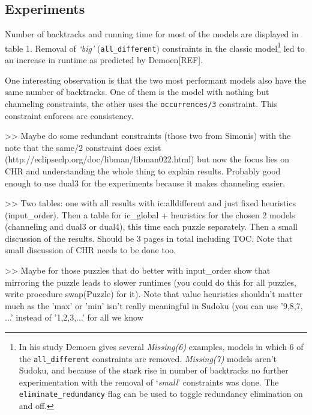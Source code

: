 \subsection{Experiments}

Number of backtracks and running time for most of the models are displayed in table 1. Removal of \textit{`big'} (\texttt{all\_different}) constraints in the classic model\footnote{In his study Demoen gives several \textit{Missing(6)} examples, models in which 6 of the \texttt{all\_different} constraints are removed. \textit{Missing(7)} models aren't Sudoku, and because of the stark rise in number of backtracks no further experimentation with the removal of `\textit{small}' constraints was done. The \texttt{eliminate\_redundancy} flag can be used to toggle redundancy elimination on and off.} led to an increase in runtime as predicted by Demoen[REF]. \\\par

One interesting observation is that the two most performant models also have the same number of backtracks. One of them is the model with nothing but channeling constraints, the other uses the \texttt{occurrences/3} constraint. This constraint enforces arc consistency.\\\par

>> Maybe do some redundant constraints (those two from Simonis) with the note that the same/2 constraint does exist (http://eclipseclp.org/doc/libman/libman022.html) but now the focus lies on CHR and understanding the whole thing to explain results. Probably good enough to use dual3 for the experiments because it makes channeling easier.

>> Two tables: one with all results with ic:alldifferent and just fixed heuristics (input\_order). Then a table for ic\_global + heuristics for the chosen 2 models (channeling and dual3 or dual4), this time each puzzle separately. Then a small discussion of the results. Should be 3 pages in total including TOC. Note that small discussion of CHR needs to be done too.

>> Maybe for those puzzles that do better with input\_order show that mirroring the puzzle leads to slower runtimes (you could do this for all puzzles, write procedure swap(Puzzle) for it). Note that value heuristics shouldn't matter much as the 'max' or 'min' isn't  really meaningful in Sudoku (you can use '9,8,7, ...' instead of '1,2,3,...' for all we know